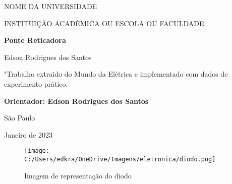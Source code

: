 \documentclass[a4paper,12pt]{article}
\begin{document}
\begin{titlepage}

\addtolength{\topmargin}{1.5cm}

\setlength{\baselineskip}{1.4\baselineskip}

\begin{center}
{\large{NOME DA UNIVERSIDADE}}

{\large{INSTITUIÇÃO ACADÊMICA OU ESCOLA OU FACULDADE}}

\end{center}
\vspace{2cm}
\begin{center}
{\Large\textbf{Ponte Reticadora}}
\end{center}

\vspace{1.5cm}

\begin{center}
{\Large{Edson Rodrigues dos Santos}}
\end{center}

\vspace{2cm}

\begin{flushright}

\begin{minipage}{10cm}

\hrulefill

"Trabalho extraido do Mundo da Elétrica e implementado com dados de experimento prático.

\hrulefill

{\textbf{Orientador: Edson Rodrigues dos Santos}}

\end{minipage}
\end{flushright}

\setlength{\baselineskip}{0.7\baselineskip}


\vfill

\begin{center}
São Paulo

Janeiro de 2023
\end{center}

\end{titlepage}
\noindent

\vspace{.07cm}
\begin{figure}[h]
\centering
	\texttt{[image: C:/Users/edkra/OneDrive/Imagens/eletronica/diodo.png]}
	\label{ConduçãoDiodo}
	\caption{Imagem de representação do diodo}	
\end{figure}
\end{document}
